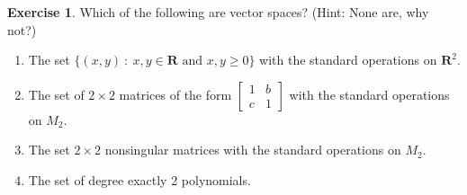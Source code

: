 \documentclass{beamer}
\newcommand{\R}{\mathbf{R}}
\newcommand{\fn}{\insertframenumber}
\theoremstyle{definition}
\newtheorem{exercise}{Exercise}
\begin{document}
\begin{frame}{\fn}
	\begin{exercise}
		Which of the following are vector spaces? (Hint: None are, why not?)
	\begin{enumerate}[label=(\alph*)]
		\item The set $\{(x,y)\ :\ x,y\in\R\text{ and }x,y\geq0\}$ with the standard operations on $\R^2$.
		\item The set of $2\times 2$ matrices of the form $\begin{bmatrix}1&b\\c&1\end{bmatrix}$ with the standard operations on $M_2$.
		\item The set $2\times 2$ nonsingular matrices with the standard operations on $M_2$.
		\item The set of degree exactly 2 polynomials.
	\end{enumerate}
	\end{exercise}
\end{frame}
%	
\end{document}
